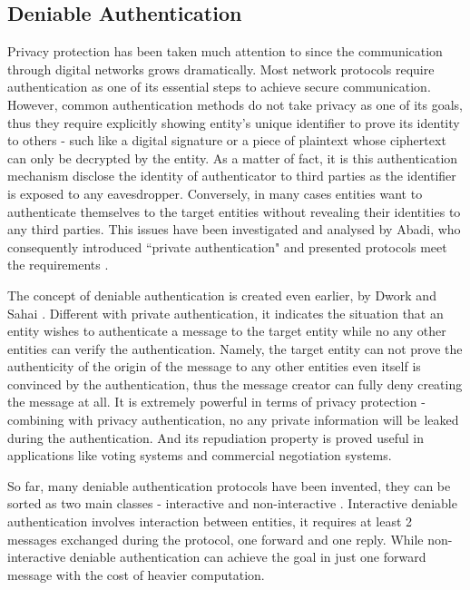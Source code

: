 \subsection{Deniable Authentication}
Privacy protection has been taken much attention to since the communication through digital networks grows dramatically. Most network protocols require authentication as one of its essential steps to achieve secure communication. However, common authentication methods do not take privacy as one of its goals, thus they require explicitly showing entity's unique identifier to prove its identity to others - such like a digital signature or a piece of plaintext whose ciphertext can only be decrypted by the entity. As a matter of fact, it is this authentication mechanism disclose the identity of authenticator to third parties as the identifier is exposed to any eavesdropper. Conversely, in many cases entities want to authenticate themselves to the target entities without revealing their identities to any third parties. This issues have been investigated and analysed by Abadi, who consequently introduced ``private authentication" and presented protocols meet the requirements \cite{Abadi}.

The concept of deniable authentication is created even earlier, by Dwork and Sahai \cite{Dwork}. Different with private authentication, it indicates the situation that an entity wishes to authenticate a message to the target entity while no any other entities can verify the authentication. Namely, the target entity can not prove the authenticity of the origin of the message to any other entities even itself is convinced by the authentication, thus the message creator can fully deny creating the message at all. It is extremely powerful in terms of privacy protection - combining with privacy authentication, no any private information will be leaked during the authentication. And its repudiation property is proved useful in applications like voting systems and commercial negotiation systems.

So far, many deniable authentication protocols have been invented, they can be sorted as two main classes - interactive \cite{Borisov} and non-interactive \cite{Xin}\cite{Wang}\cite{Shao}. Interactive deniable authentication involves interaction between entities, it requires at least 2 messages exchanged during the protocol, one forward and one reply. While non-interactive deniable authentication can achieve the goal in just one forward message with the cost of heavier computation.

